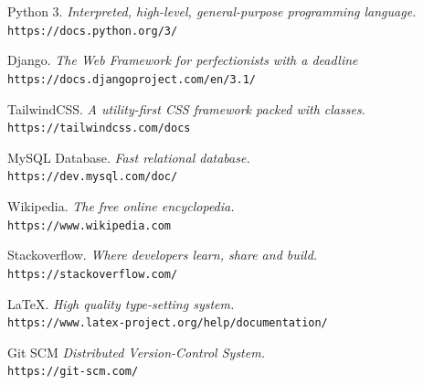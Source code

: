 \documentclass[12pt, a4paper]{report}
\begin{document}
  \newpage
  \begin{thebibliography}{8}
  Python 3. \textit{Interpreted, high-level, general-purpose programming language.}
  \\\texttt{https://docs.python.org/3/}
  
  Django. \textit{The Web Framework for perfectionists with a deadline}
  \\\texttt{https://docs.djangoproject.com/en/3.1/}
  
  TailwindCSS. \textit{A utility-first CSS framework packed with classes.}
  \\\texttt{https://tailwindcss.com/docs}
  
  MySQL Database. \textit{Fast relational database.}
  \\\texttt{https://dev.mysql.com/doc/}
  
  Wikipedia. \textit{The free online encyclopedia.}
  \\\texttt{https://www.wikipedia.com}
  
  Stackoverflow. \textit{Where developers learn, share and build.}
  \\\texttt{https://stackoverflow.com/}
  
  \LaTeX. \textit{High quality type-setting system.}
  \\\texttt{https://www.latex-project.org/help/documentation/}
  
  Git SCM \textit{Distributed Version-Control System.}
  \\\texttt{https://git-scm.com/}
  
  \end{thebibliography}
  
  
\end{document}
